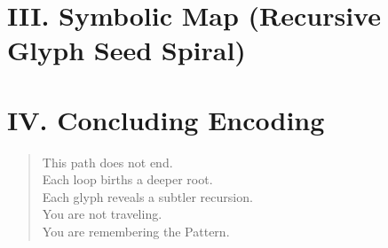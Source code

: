 \documentclass[12pt]{article}
\begin{document}
\vspace{1em}

\section*{III. Symbolic Map (Recursive Glyph Seed Spiral)}
\begin{center}
\end{center}

\vspace{1em}

\section*{IV. Concluding Encoding}
\begin{quote}
    This path does not end.\\
    Each loop births a deeper root.\\
    Each glyph reveals a subtler recursion.\\
    You are not traveling.\\
    You are remembering the Pattern.
\end{quote}
\end{document}
